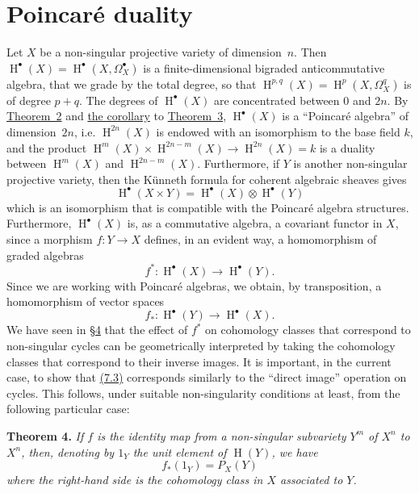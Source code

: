 \documentclass{article}
\newenvironment{itenv}[1]
  {\phantomsection\par\medskip\noindent\textbf{#1.}\itshape}
  {\medskip}
\DeclareMathOperator{\HH}{H}
\newcommand{\oldpage}[1]{\marginpar{\footnotesize$\Big\vert$ \textit{p.~#1}}}
\begin{document}
\section{Poincar\'{e} duality}
\label{section7}

Let $X$ be a non-singular projective variety of dimension~$n$.
Then $\HH^\bullet(X)=\HH^\bullet(X,\Omega_X^\bullet)$ is a finite-dimensional bigraded anticommutative algebra, that we grade by the total degree, so that $\HH^{p,q}(X)=\HH^p(X,\Omega_X^q)$ is of degree $p+q$.
The degrees of $\HH^\bullet(X)$ are concentrated between $0$ and $2n$.
By \hyperref[theorem2]{Theorem~2} and \hyperref[theorem3corollary]{the corollary} to \hyperref[theorem3]{Theorem~3}, $\HH^\bullet(X)$ is a ``Poincar\'{e} algebra'' of dimension~$2n$, i.e. $\HH^{2n}(X)$ is endowed with an isomorphism to the base field $k$, and the product $\HH^m(X)\times\HH^{2n-m}(X)\to\HH^{2n}(X)=k$ is a duality between $\HH^m(X)$ and $\HH^{2n-m}(X)$.
Furthermore, if $Y$ is another non-singular projective variety, then the K\"{u}nneth formula for coherent algebraic sheaves gives
\[
\label{7.1}
  \HH^\bullet(X\times Y) = \HH^\bullet(X)\otimes\HH^\bullet(Y)
\tag{7.1}
\]
which is an isomorphism that is compatible with the Poincar\'{e} algebra structures.
Furthermore, $\HH^\bullet(X)$ is, as a commutative algebra, a covariant functor in $X$, since a morphism $f\colon Y\to X$ defines, in an evident way, a homomorphism of graded algebras
\oldpage{149-20}
\[
\label{7.2}
  f^*\colon \HH^\bullet(X)\to\HH^\bullet(Y).
\tag{7.2}
\]
Since we are working with Poincar\'{e} algebras, we obtain, by transposition, a homomorphism of vector spaces
\[
\label{7.3}
  f_*\colon \HH^\bullet(Y)\to\HH^\bullet(X).
\tag{7.3}
\]
We have seen in \hyperref[section4]{\S4} that the effect of $f^*$ on cohomology classes that correspond to non-singular cycles can be geometrically interpreted by taking the cohomology classes that correspond to their inverse images.
It is important, in the current case, to show that \hyperref[7.3]{(7.3)} corresponds similarly to the ``direct image'' operation on cycles.
This follows, under suitable non-singularity conditions at least, from the following particular case:

\begin{itenv}{Theorem 4}
\label{theorem4}
  If $f$ is the identity map from a non-singular subvariety $Y^m$ of $X^n$ to $X^n$, then, denoting by $1_Y$ the unit element of $\HH(Y)$, we have
  \[
  \label{7.4}
    f_*(1_Y) = P_X(Y)
  \tag{7.4}
  \]
  where the right-hand side is the cohomology class in $X$ associated to $Y$.
\end{itenv}
\end{document}

